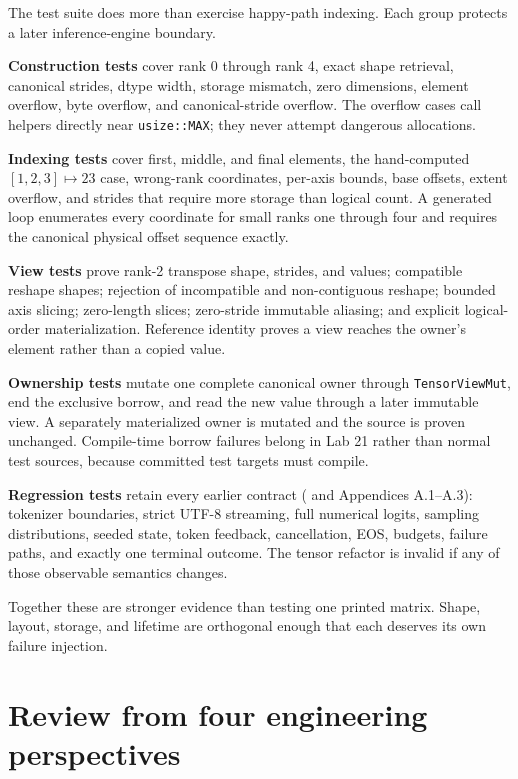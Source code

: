 The test suite does more than exercise happy-path indexing. Each group
protects a later inference-engine boundary.

\textbf{Construction tests} cover rank 0 through rank 4, exact shape
retrieval, canonical strides, dtype width, storage mismatch, zero
dimensions, element overflow, byte overflow, and canonical-stride
overflow. The overflow cases call helpers directly near
\texttt{usize::MAX}; they never attempt dangerous allocations.

\textbf{Indexing tests} cover first, middle, and final elements, the
hand-computed \([1,2,3]\mapsto23\) case, wrong-rank coordinates,
per-axis bounds, base offsets, extent overflow, and strides that require
more storage than logical count. A generated loop enumerates every
coordinate for small ranks one through four and requires the canonical
physical offset sequence exactly.

\textbf{View tests} prove rank-2 transpose shape, strides, and values;
compatible reshape shapes; rejection of incompatible and non-contiguous
reshape; bounded axis slicing; zero-length slices; zero-stride immutable
aliasing; and explicit logical-order materialization. Reference identity
proves a view reaches the owner's element rather than a copied value.

\textbf{Ownership tests} mutate one complete canonical owner through
\texttt{TensorViewMut}, end the exclusive borrow, and read the new value
through a later immutable view. A separately materialized owner is
mutated and the source is proven unchanged. Compile-time borrow failures
belong in Lab 21 rather than normal test sources, because committed test
targets must compile.

\textbf{Regression tests} retain every earlier contract ( and Appendices A.1--A.3): tokenizer
boundaries, strict UTF-8 streaming, full numerical logits, sampling
distributions, seeded state, token feedback, cancellation, EOS, budgets,
failure paths, and exactly one terminal outcome. The tensor refactor is
invalid if any of those observable semantics changes.

Together these are stronger evidence than testing one printed matrix.
Shape, layout, storage, and lifetime are orthogonal enough that each
deserves its own failure injection.

\section{Review from four engineering
perspectives}\label{review-from-four-engineering-perspectives}

